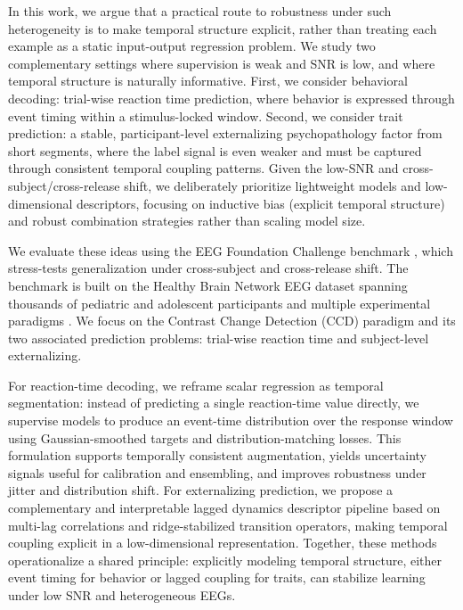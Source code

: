 \documentclass[12pt]{article}
\begin{document}
In this work, we argue that a practical route to robustness under such heterogeneity is to make temporal structure explicit, rather than treating each example as a static input-output regression problem.
We study two complementary settings where supervision is weak and SNR is low, and where temporal structure is naturally informative. 
First, we consider behavioral decoding: trial-wise reaction time prediction, where behavior is expressed through event timing within a stimulus-locked window. 
Second, we consider trait prediction: a stable, participant-level externalizing psychopathology factor from short segments, where the label signal is even weaker and must be captured through consistent temporal coupling patterns. 
Given the low-SNR and cross-subject/cross-release shift, we deliberately prioritize lightweight models and low-dimensional descriptors, focusing on inductive bias (explicit temporal structure) and robust combination strategies rather than scaling model size.

We evaluate these ideas using the EEG Foundation Challenge benchmark \citep{EEGFoundationChallengeArxiv2025}, which stress-tests generalization under cross-subject and cross-release shift. The benchmark is built on the Healthy Brain Network EEG dataset spanning thousands of pediatric and adolescent participants and multiple experimental paradigms \citep{Shirazi2024HBNEEG}. We focus on the Contrast Change Detection (CCD) paradigm and its two associated prediction problems: trial-wise reaction time and subject-level externalizing.

For reaction-time decoding, we reframe scalar regression as temporal segmentation: instead of predicting a single reaction-time value directly, we supervise models to produce an event-time distribution over the response window using Gaussian-smoothed targets and distribution-matching losses. This formulation supports temporally consistent augmentation, yields uncertainty signals useful for calibration and ensembling, and improves robustness under jitter and distribution shift. For externalizing prediction, we propose a complementary and interpretable lagged dynamics descriptor pipeline based on multi-lag correlations and ridge-stabilized transition operators, making temporal coupling explicit in a low-dimensional representation. Together, these methods operationalize a shared principle: explicitly modeling temporal structure, either event timing for behavior or lagged coupling for traits, can stabilize learning under low SNR and heterogeneous EEGs.
\end{document}
